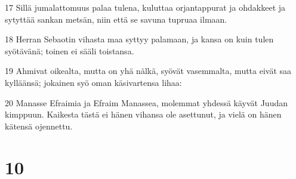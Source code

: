 \par 17 Sillä jumalattomuus palaa tulena, kuluttaa orjantappurat ja ohdakkeet ja sytyttää sankan metsän, niin että se savuna tupruaa ilmaan.
\par 18 Herran Sebaotin vihasta maa syttyy palamaan, ja kansa on kuin tulen syötävänä; toinen ei sääli toistansa.
\par 19 Ahmivat oikealta, mutta on yhä nälkä, syövät vasemmalta, mutta eivät saa kylläänsä; jokainen syö oman käsivartensa lihaa:
\par 20 Manasse Efraimia ja Efraim Manassea, molemmat yhdessä käyvät Juudan kimppuun. Kaikesta tästä ei hänen vihansa ole asettunut, ja vielä on hänen kätensä ojennettu.

\chapter{10}

